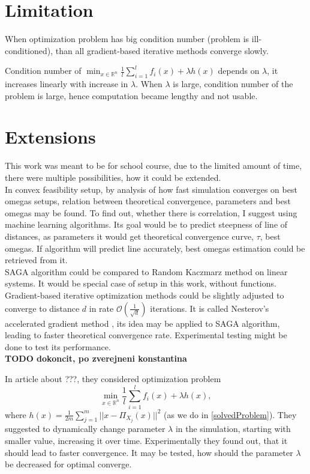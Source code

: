 \documentclass[11pt]{book}
\newcommand{\R}{\mathbb{R}}
\begin{document}
\section{Limitation}
When optimization problem has big condition number (problem is ill-conditioned), than all gradient-based iterative methods converge slowly.

Condition number of $ \min_{x \in \R^n} \frac{1}{l}\sum_{i=1}^l f_i(x) + \lambda h(x)$ depends on $\lambda$, it increases linearly with increase in $\lambda$. When $\lambda$ is large, condition number of the problem is large, hence computation became lengthy and not usable.

\section{Extensions}
This work was meant to be for school course, due to the limited amount of time, there were multiple possibilities, how it could be extended.\\


In convex feasibility setup, by analysis of how fast simulation converges on best omegas setups, relation between theoretical convergence, parameters and best omegas may be found. To find out, whether there is correlation, I suggest using machine learning algorithms. Its goal would be to predict steepness of line of distances, as parameters it would get theoretical convergence curve, $\tau$, best omegas. If algorithm will predict line accurately, best omegas estimation could be retrieved from it.\\


SAGA algorithm could be compared to Random Kaczmarz method on linear systems. It would be special case of setup in this work, without functions.\\

Gradient-based iterative optimization methods could be slightly adjusted to converge to distance $d$ in rate $\mathcal{O}(\frac{1}{\sqrt{d}})$ iterations. It is called Nesterov's accelerated gradient method \cite{acceleration}, its idea may be applied to SAGA algorithm, leading to faster theoretical convergence rate. Experimental testing might be done to test its performance.\\

\textbf{TODO dokoncit, po zverejneni konstantina}

In article \cite{kosto} about ???, they considered optimization problem $$ \min_{x \in \R^n} \frac{1}{l}\sum_{i=1}^l f_i(x) + \lambda h(x),$$ where $h(x)=\frac{1}{2m}\sum_{j=1}^m ||x-\Pi_{X_j}(x)||^2$ (as we do in \ref{solvedProblem}). They suggested to dynamically change parameter $\lambda$ in the simulation, starting with smaller value, increasing it over time. Experimentally they found out, that it should lead to faster convergence. It may be tested, how should the parameter $\lambda$ be decreased for optimal converge.





\end{document}
